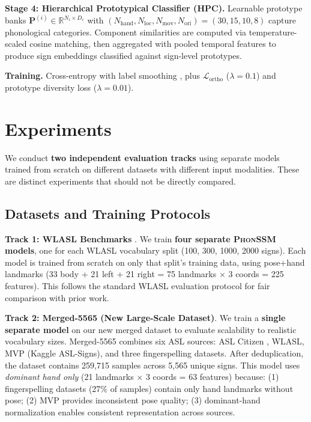 \documentclass[runningheads]{llncs}
\newcommand{\phonssm}{\textsc{PhonSSM}}
\newcommand{\hpc}{\textsc{HPC}}
\begin{document}
\textbf{Stage 4: Hierarchical Prototypical Classifier (\hpc{}).} Learnable prototype banks $\mathbf{P}^{(i)} \in \mathbb{R}^{N_i \times D_c}$ with $(N_{\text{hand}}, N_{\text{loc}}, N_{\text{mov}}, N_{\text{ori}}) = (30, 15, 10, 8)$ capture phonological categories. Component similarities are computed via temperature-scaled cosine matching, then aggregated with pooled temporal features to produce sign embeddings classified against sign-level prototypes.

\textbf{Training.} Cross-entropy with label smoothing \cite{szegedy2016rethinking}, plus $\mathcal{L}_{\text{ortho}}$ ($\lambda{=}0.1$) and prototype diversity loss ($\lambda{=}0.01$).

\section{Experiments}
\label{sec:experiments}

We conduct \textbf{two independent evaluation tracks} using separate models trained from scratch on different datasets with different input modalities. These are distinct experiments that should not be directly compared.

\subsection{Datasets and Training Protocols}

\textbf{Track 1: WLASL Benchmarks} \cite{li2020word}. We train \textbf{four separate \phonssm{} models}, one for each WLASL vocabulary split (100, 300, 1000, 2000 signs). Each model is trained from scratch on only that split's training data, using pose+hand landmarks (33 body + 21 left + 21 right = 75 landmarks $\times$ 3 coords = 225 features). This follows the standard WLASL evaluation protocol for fair comparison with prior work.

\textbf{Track 2: Merged-5565 (New Large-Scale Dataset)}. We train a \textbf{single separate model} on our new merged dataset to evaluate scalability to realistic vocabulary sizes. Merged-5565 combines six ASL sources: ASL Citizen \cite{desai2023asl}, WLASL, MVP (Kaggle ASL-Signs), and three fingerspelling datasets. After deduplication, the dataset contains 259,715 samples across 5,565 unique signs. This model uses \textit{dominant hand only} (21 landmarks $\times$ 3 coords = 63 features) because: (1) fingerspelling datasets (27\% of samples) contain only hand landmarks without pose; (2) MVP provides inconsistent pose quality; (3) dominant-hand normalization enables consistent representation across sources.
\end{document}
